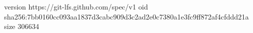 version https://git-lfs.github.com/spec/v1
oid sha256:7bb0160cc093aa1837d3cabc909d3c2ad2e0c7380a1e3fc9ff872af4cfddd21a
size 306634
